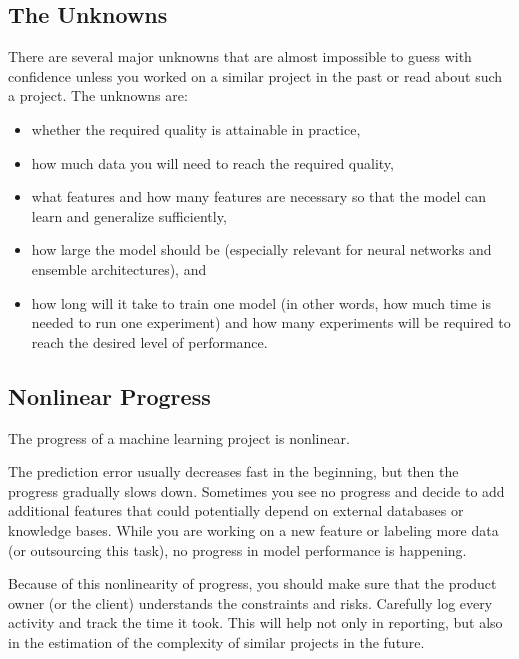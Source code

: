 \subsection*{The Unknowns}
There are several major unknowns that are almost impossible to guess with confidence unless
you worked on a similar project in the past or read about such a project. The unknowns are:
\begin{itemize}
    \item whether the required quality is attainable in practice,
    \item how much data you will need to reach the required quality,
    \item what features and how many features are necessary so that the model can learn and
    generalize sufficiently,
    \item how large the model should be (especially relevant for neural networks and ensemble
    architectures), and
    \item how long will it take to train one model (in other words, how much time is needed to
    run one experiment) and how many experiments will be required to reach the desired
    level of performance.
\end{itemize}

\subsection*{Nonlinear Progress}
The progress of a machine learning project is nonlinear.

The prediction error usually decreases fast in the beginning, but then the progress gradually
slows down. Sometimes you see no  progress and decide to add additional features that could
potentially depend on external databases or knowledge bases. While you are working on a new 
feature or labeling more data (or outsourcing this task), no progress in model performance is
happening.

Because of this nonlinearity of progress, you should make sure that the product owner (or
the client) understands the constraints and risks. Carefully log every activity and track the
time it took. This will help not only in reporting, but also in the estimation of the complexity
of similar projects in the future.






